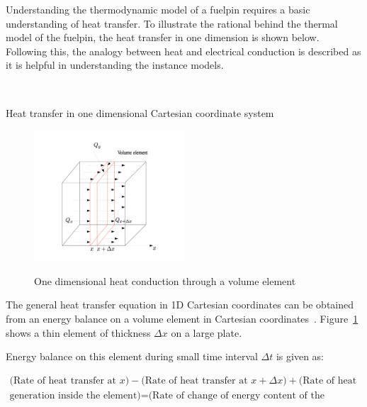 Understanding the thermodynamic model of a fuelpin requires a basic
understanding of heat transfer. To illustrate the rational behind the thermal
model of the fuelpin, the heat transfer in one dimension is shown
below. Following this, the analogy between heat and electrical conduction is
described as it is helpful in understanding the instance models.

~\newline
\begin{bf}
Heat transfer in one dimensional Cartesian coordinate system\\
\end{bf}

\begin{figure}
\begin{center}
{
 \includegraphics[width=0.5\textwidth]{heatcube.png}
}
\caption{\label{Fig_1DHeatConduction} One dimensional heat conduction through a volume element }
\end{center}
\end{figure}

The general heat transfer equation in 1D Cartesian coordinates can be obtained
from an energy balance on a volume element in Cartesian coordinates~\cite[page
34--36]{HeatConduction}.  Figure~\ref{Fig_1DHeatConduction} shows a thin
element of thickness $\Delta x$ on a large plate.

Energy balance on this element during small time interval $\Delta t$ is given
as:

\begin{equation}
\begin{split}
 \text{(Rate of heat transfer at }x) - \text{(Rate of heat transfer at }x+\Delta x) + \text{(Rate of heat} \\\text{generation inside the element)=(Rate of change of energy content of the element)}\label{eq:1}
\end{split}
\end{equation}

